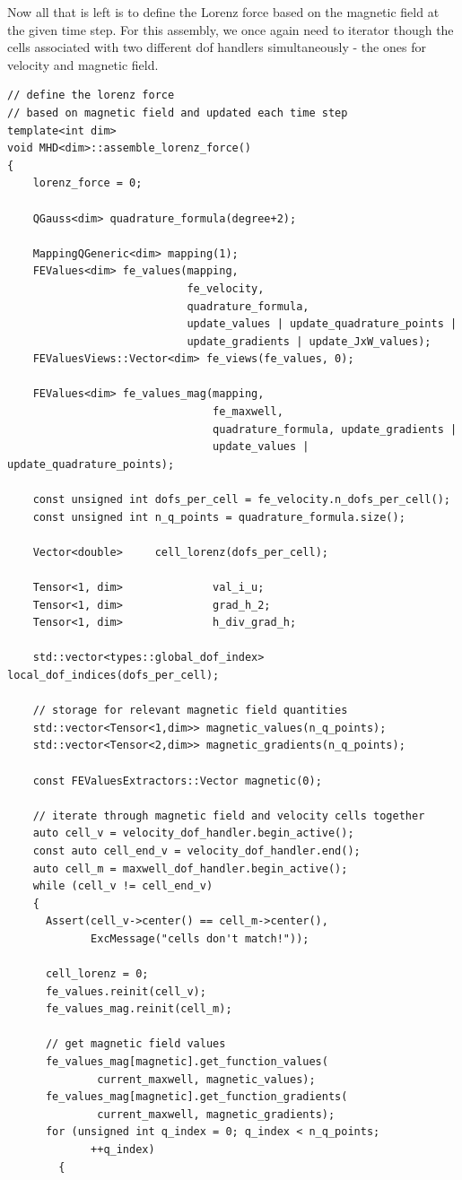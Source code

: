 \documentclass{article}
\begin{document}
Now all that is left is to define the Lorenz force based on the magnetic field at the given time step. For this assembly, we once again need to iterator though the cells associated with two different dof handlers simultaneously - the ones for velocity and magnetic field.
\begin{lstlisting}
// define the lorenz force
// based on magnetic field and updated each time step
template<int dim>
void MHD<dim>::assemble_lorenz_force()
{
    lorenz_force = 0;

    QGauss<dim> quadrature_formula(degree+2);

    MappingQGeneric<dim> mapping(1);
    FEValues<dim> fe_values(mapping,
                            fe_velocity,
                            quadrature_formula,
                            update_values | update_quadrature_points |
                            update_gradients | update_JxW_values);
    FEValuesViews::Vector<dim> fe_views(fe_values, 0);

    FEValues<dim> fe_values_mag(mapping,
                                fe_maxwell,
                                quadrature_formula, update_gradients |
                                update_values | update_quadrature_points);

    const unsigned int dofs_per_cell = fe_velocity.n_dofs_per_cell();
    const unsigned int n_q_points = quadrature_formula.size();

    Vector<double>     cell_lorenz(dofs_per_cell);

    Tensor<1, dim>              val_i_u;
    Tensor<1, dim>              grad_h_2;
    Tensor<1, dim>              h_div_grad_h;

    std::vector<types::global_dof_index> local_dof_indices(dofs_per_cell);

    // storage for relevant magnetic field quantities
    std::vector<Tensor<1,dim>> magnetic_values(n_q_points);
    std::vector<Tensor<2,dim>> magnetic_gradients(n_q_points);

    const FEValuesExtractors::Vector magnetic(0);

    // iterate through magnetic field and velocity cells together
    auto cell_v = velocity_dof_handler.begin_active();
    const auto cell_end_v = velocity_dof_handler.end();
    auto cell_m = maxwell_dof_handler.begin_active();
    while (cell_v != cell_end_v)
    {
      Assert(cell_v->center() == cell_m->center(),
             ExcMessage("cells don't match!"));

      cell_lorenz = 0;
      fe_values.reinit(cell_v);
      fe_values_mag.reinit(cell_m);

      // get magnetic field values
      fe_values_mag[magnetic].get_function_values(
              current_maxwell, magnetic_values);
      fe_values_mag[magnetic].get_function_gradients(
              current_maxwell, magnetic_gradients);
      for (unsigned int q_index = 0; q_index < n_q_points;
             ++q_index)
        {
            \end{lstlisting}
\end{document}
